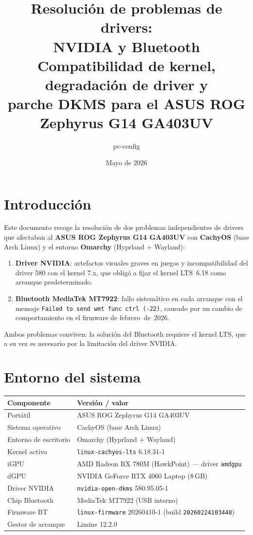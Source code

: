 \documentclass[12pt,a4paper]{article}
\title{%
  \textbf{Resolución de problemas de drivers:}\\
  \textbf{NVIDIA y Bluetooth}\\[0.4em]
  \large Compatibilidad de kernel, degradación de driver y\\
  parche DKMS para el ASUS ROG Zephyrus G14 GA403UV
}
\author{pc-config}
\date{Mayo de 2026}
\begin{document}
\maketitle
\tableofcontents
\newpage

\section{Introducción}

Este documento recoge la resolución de dos problemas independientes de drivers
que afectaban al \textbf{ASUS ROG Zephyrus G14 GA403UV} con
\textbf{CachyOS} (base Arch Linux) y el entorno \textbf{Omarchy} (Hyprland +
Wayland):

\begin{enumerate}
  \item \textbf{Driver NVIDIA}: artefactos visuales graves en juegos y
        incompatibilidad del driver 580 con el kernel 7.x, que obligó a fijar
        el kernel LTS~6.18 como arranque predeterminado.
  \item \textbf{Bluetooth MediaTek MT7922}: fallo sistemático en cada arranque
        con el mensaje \texttt{Failed to send wmt func ctrl (-22)}, causado por
        un cambio de comportamiento en el firmware de febrero~de~2026.
\end{enumerate}

Ambos problemas conviven: la solución del Bluetooth requiere el kernel LTS, que
a su vez es necesario por la limitación del driver NVIDIA.

\section{Entorno del sistema}

\begin{center}
\begin{tabular}{ll}
  \toprule
  Componente & Versión / valor \\
  \midrule
  Portátil            & ASUS ROG Zephyrus G14 GA403UV \\
  Sistema operativo   & CachyOS (base Arch Linux) \\
  Entorno de escritorio & Omarchy (Hyprland + Wayland) \\
  Kernel activo       & \texttt{linux-cachyos-lts} 6.18.31-1 \\
  iGPU                & AMD Radeon RX 780M (HawkPoint) --- driver \texttt{amdgpu} \\
  dGPU                & NVIDIA GeForce RTX 4060 Laptop (8\,GB) \\
  Driver NVIDIA       & \texttt{nvidia-open-dkms} 580.95.05-1 \\
  Chip Bluetooth      & MediaTek MT7922 (USB interno) \\
  Firmware BT         & \texttt{linux-firmware} 20260410-1 (build \texttt{20260224103448}) \\
  Gestor de arranque  & Limine 12.2.0 \\
  \bottomrule
\end{tabular}
\end{center}
\end{document}
